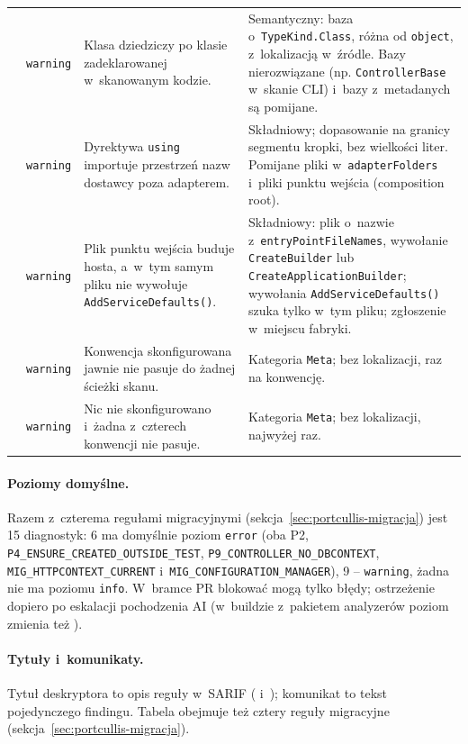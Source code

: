 \begin{xltabular}{\linewidth}{@{}>{\raggedright\arraybackslash}p{4.3cm} >{\raggedright\arraybackslash}p{1.25cm} >{\raggedright\arraybackslash}X >{\raggedright\arraybackslash}X@{}}
 & \texttt{warning} & Klasa dziedziczy po klasie zadeklarowanej w~skanowanym kodzie. & Semantyczny: baza o~\texttt{TypeKind.Class}, różna od \texttt{object}, z~lokalizacją w~źródle. Bazy nierozwiązane (np. \texttt{ControllerBase} w~skanie CLI) i~bazy z~metadanych są pomijane. \\
 & \texttt{warning} & Dyrektywa \texttt{using} importuje przestrzeń nazw dostawcy poza adapterem. & Składniowy; dopasowanie na granicy segmentu kropki, bez wielkości liter. Pomijane pliki w~\texttt{adapterFolders} i~pliki punktu wejścia (composition root). \\
 & \texttt{warning} & Plik punktu wejścia buduje hosta, a~w~tym samym pliku nie wywołuje \texttt{AddServiceDefaults()}. & Składniowy: plik o~nazwie z~\texttt{entryPointFileNames}, wywołanie \texttt{CreateBuilder} lub \texttt{CreateApplicationBuilder}; wywołania \texttt{AddServiceDefaults()} szuka tylko w~tym pliku; zgłoszenie w~miejscu fabryki. \\
 & \texttt{warning} & Konwencja skonfigurowana jawnie nie pasuje do żadnej ścieżki skanu. & Kategoria \texttt{Meta}; bez lokalizacji, raz na konwencję. \\
 & \texttt{warning} & Nic nie skonfigurowano i~żadna z~czterech konwencji nie pasuje. & Kategoria \texttt{Meta}; bez lokalizacji, najwyżej raz. \\
\bottomrule
\end{xltabular}
\endgroup

\paragraph{Poziomy domyślne.} Razem z~czterema regułami migracyjnymi
(sekcja~\ref{sec:portcullis-migracja}) jest 15 diagnostyk: 6 ma domyślnie poziom \texttt{error}
(oba P2, \texttt{P4\_ENSURE\_CREATED\_OUTSIDE\_TEST}, \texttt{P9\_CONTROLLER\_NO\_DBCONTEXT},
\texttt{MIG\_HTTPCONTEXT\_CURRENT} i~\texttt{MIG\_CONFIGURATION\_MANAGER}), 9 -- \texttt{warning},
żadna nie ma poziomu \texttt{info}. W~bramce PR blokować mogą tylko błędy; ostrzeżenie dopiero
po eskalacji pochodzenia AI (w~buildzie z~pakietem analyzerów poziom zmienia też
).

\paragraph{Tytuły i~komunikaty.} Tytuł deskryptora to opis reguły w~SARIF
( i~); komunikat to tekst pojedynczego
findingu. Tabela obejmuje też cztery reguły migracyjne (sekcja~\ref{sec:portcullis-migracja}).


